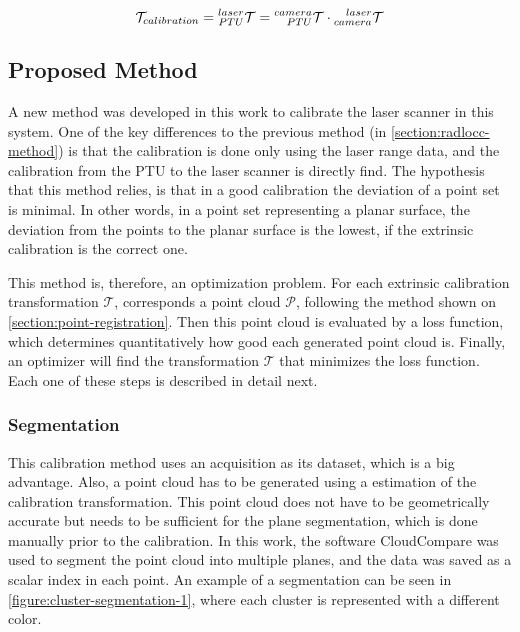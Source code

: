 \begin{equation}
    \label{eqn:radlocc-full-calibration}
    \mathcal{T}_{calibration} = \TF{PTU}{laser} = \TF{PTU}{camera} \cdot \TF{camera}{laser}
\end{equation}

\subsection{Proposed Method}
\label{section:proposed-method}

A new method was developed in this work to calibrate the laser scanner in this system. One of the key differences to the previous method (in \cref{section:radlocc-method}) is that the calibration is done only using the laser range data, and the calibration from the PTU to the laser scanner is directly find. The hypothesis that this method relies, is that in a good calibration the deviation of a point set is minimal. In other words, in a point set representing a planar surface, the deviation from the points to the planar surface is the lowest, if the extrinsic calibration is the correct one.

This method is, therefore, an optimization problem. For each extrinsic calibration transformation $\mathcal{T}$, corresponds a point cloud $\mathcal{P}$, following the method shown on \cref{section:point-registration}. Then this point cloud is evaluated by a loss function, which determines quantitatively how good each generated point cloud is. Finally, an optimizer will find the transformation $\mathcal{T}$ that minimizes the loss function. Each one of these steps is described in detail next.

\subsubsection{Segmentation}

This calibration method uses an acquisition as its dataset, which is a big advantage. Also, a point cloud has to be generated using a estimation of the calibration transformation. This point cloud does not have to be geometrically accurate but needs to be sufficient for the plane segmentation, which is done manually prior to the calibration. In this work, the software CloudCompare was used to segment the point cloud into multiple planes, and the data was saved as a scalar index in each point. An example of a segmentation can be seen in \cref{figure:cluster-segmentation-1}, where each cluster is represented with a different color.

